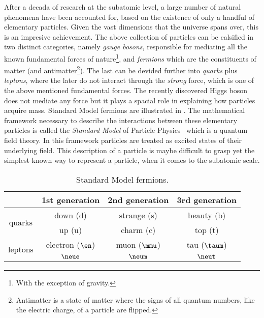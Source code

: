 After a decada of research at the subatomic level, a large number of natural phenomena have been accounted
for, based on the existence of only a handful of elementary particles. Given the vast dimensions that the
universe spans over, this is an impresive achievement. The above collection of particles can be calsified
in two distinct categories, namely {\it gauge bosons}, responsible for mediating all the known fundamental
forces of nature\footnote{With the exception of gravity.}, and {\it fermions} which are the constituents
of matter
(and antimatter\footnote{Antimatter is a state of matter where the signs of all quantum numbers, like the electric charge, of a particle are flipped.}).
The last can be devided further into {\it quarks} plus {\it leptons}, where the later do not interact through
the {\it strong} force, which is one of the above mentioned fundamental forces. The recently discovered Higgs
boson~\cite{higgs-cms,higgs-atlas} does not mediate any force but it plays a spacial role in explaining how
particles acquire mass. Standard Model fermions are illustrated in .
The mathematical framework necessary to describe the interactions between these elementary particles is called
the \textit{Standard Model} of Particle Physics~\cite{sm-glashow,sm-weinberg,sm-salam} which is a quantum field theory.
In this framework particles are treated as excited states of their underlying field. This description of a
particle is maybe difficult to grasp yet the simplest known way to represent a particle, when it comes to the subatomic scale.


\begin{table}[h!]
  \centering
 \begin{tabular}{cccc}
   \hline
                            &  1st generation         &  2nd generation    &  3rd generation    \\
   \hline
   \multirow{2}{*}{quarks}  & down (d)               &  strange (s)       &  beauty (b)        \\
                            &  up (u)                 &  charm (c)         &  top (t)           \\
   \hline
   \multirow{2}{*}{leptons} &    electron ($\en$)       &  muon ($\mmu$)     &  tau ($\taum$)     \\
                            &   $\neue$                &  $\neum$           &  $\neut$           \\
   \hline
 \end{tabular}
 \caption{Standard Model fermions.}
 \label{quarksLeptons}
\end{table}


